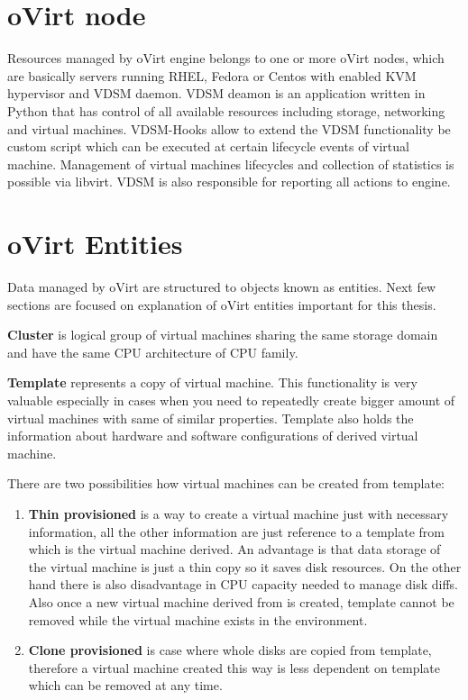 \section{oVirt node}
Resources managed by oVirt engine belongs to one or more oVirt nodes, which are basically servers running RHEL, Fedora or Centos with enabled KVM\cite{kvm} hypervisor and VDSM daemon. VDSM deamon is an application written in Python that has control of all available resources including storage, networking and virtual machines. VDSM-Hooks\cite{hooks} allow to extend the VDSM functionality be custom script which can be executed at certain lifecycle events of virtual machine. Management of virtual machines lifecycles and collection of statistics is possible via libvirt\cite{libvirt}. VDSM is also responsible for reporting all actions to engine.

\section{oVirt Entities}
Data managed by oVirt are structured to objects known as entities. Next few sections are focused on explanation of oVirt entities important for this thesis.

\textbf{Cluster} is logical group of virtual machines sharing the same storage domain and have the same CPU architecture of CPU family.

\textbf{Template} represents a copy of virtual machine. This functionality is very valuable especially in cases when you need to repeatedly create bigger amount of virtual machines with same of similar properties. Template also holds the information about hardware and software configurations of derived virtual machine. 

\noindent There are two possibilities how virtual machines can be created from template: 
\begin{enumerate}

\item \textbf{Thin provisioned} is a way to create a virtual machine just with necessary information, all the other information are just reference to a template from which is the virtual machine derived. An advantage is that data storage of the virtual machine is just a thin copy so it saves disk resources. On the other hand there is also disadvantage in CPU capacity needed to manage disk diffs. Also once a new virtual machine derived from is created, template cannot be removed while the virtual machine exists in the environment. 

\item \textbf{Clone provisioned} is case where whole disks are copied from template, therefore a virtual machine created this way is less dependent on template which can be removed at any time.
\end{enumerate} 

